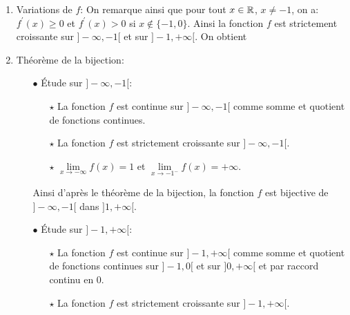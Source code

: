 \documentclass[a4paper, 11pt,reqno]{article}
\begin{document}
\begin{correction}
\begin{enumerate}
		\item Variations de $f$:
		      On remarque ainsi que pour tout $x\in\mathbb{R}$, $x\not= -1$, on a: $f^{\prime}(x)\geq 0$ et $f^{\prime}(x)>0$ si $x\notin\lbrace -1,0\rbrace$. Ainsi la fonction $f$ est strictement croissante sur $\rbrack -\infty,-1\lbrack$ et sur $\rbrack -1,+\infty\lbrack$. On obtient
		      \begin{center}
		      \end{center}
		\item Th\'eor\`{e}me de la bijection:
		      \begin{itemize}
			      \item[$\bullet$] \'Etude sur $\rbrack -\infty,-1\lbrack$:
			            \begin{itemize}
				            \item[$\star$] La fonction $f$ est continue sur $\rbrack -\infty,-1\lbrack$ comme somme et quotient de fonctions continues.
				            \item[$\star$] La fonction $f$ est strictement croissante sur $\rbrack -\infty,-1\lbrack$.
				            \item[$\star$] $\lim\limits_{x\to -\infty} f(x)=1$ et $\lim\limits_{x\to -1^-} f(x)=+\infty$.
			            \end{itemize}
			            Ainsi d'apr\`{e}s le th\'eor\`{e}me de la bijection, la fonction $f$ est bijective de $\rbrack -\infty,-1\lbrack$ dans $\rbrack 1,+\infty\lbrack$.
			      \item[$\bullet$] \'Etude sur $\rbrack -1,+\infty \lbrack$:
			            \begin{itemize}
				            \item[$\star$] La fonction $f$ est continue sur $\rbrack -1,+\infty\lbrack$ comme somme et quotient de fonctions continues sur $\rbrack -1,0\lbrack$ et sur $\rbrack 0,+\infty\lbrack$ et par raccord continu en 0.
				            \item[$\star$] La fonction $f$ est strictement croissante sur $\rbrack -1,+\infty \lbrack$.

\end{itemize}
\end{itemize}
\end{enumerate}
\end{correction}
\end{document}

